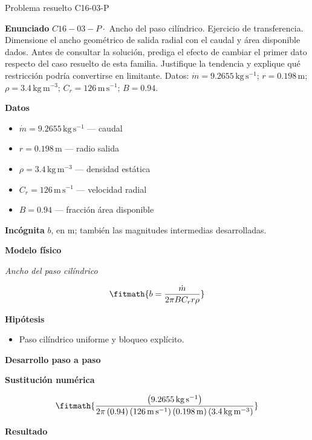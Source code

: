 \documentclass[10pt,openany]{book}
\begin{document}
\begin{studiumworked}{Problema resuelto C16-03-P}


\noindent\textbf{Enunciado}
\(C16-03-P \cdot\) Ancho del paso cilíndrico. Ejercicio de transferencia. Dimensione el ancho geométrico de salida radial con el caudal y área disponible dados. Antes de consultar la solución, prediga el efecto de cambiar el primer dato respecto del caso resuelto de esta familia. Justifique la tendencia y explique qué restricción podría convertirse en limitante. Datos: \(\dot m=9.2655\, \mathrm{kg}\,\mathrm{s}^{-1}\); \(r=0.198\, \mathrm{m}\); \(\rho=3.4\, \mathrm{kg}\,\mathrm{m}^{-3}\); \(C_r=126\, \mathrm{m}\,\mathrm{s}^{-1}\); \(B=0.94\).

\noindent\textbf{Datos}
\begin{itemize}
\item $\dot m = 9.2655\,\mathrm{kg}\,\mathrm{s}^{-1}$ — caudal
\item $r = 0.198\,\mathrm{m}$ — radio salida
\item $\rho = 3.4\,\mathrm{kg}\,\mathrm{m}^{-3}$ — densidad estática
\item $C_r = 126\,\mathrm{m}\,\mathrm{s}^{-1}$ — velocidad radial
\item $B = 0.94$ — fracción área disponible
\end{itemize}

\noindent\textbf{Incógnita}
$b$, en $\mathrm{m}$; también las magnitudes intermedias desarrolladas.

\noindent\textbf{Modelo físico}

\noindent\textit{Ancho del paso cilíndrico}

\[
\fitmath{b=\frac{\dot m}{2 \pi B C_r r \rho}}
\]

\noindent\textbf{Hipótesis}
\begin{itemize}
\item Paso cilíndrico uniforme y bloqueo explícito.
\end{itemize}

\noindent\textbf{Desarrollo paso a paso}



\noindent\textbf{Sustitución numérica}

\[
\fitmath{\frac{\left(9.2655\,\mathrm{kg}\,\mathrm{s}^{-1}\right)}{2 \pi \left(0.94\right) \left(126\,\mathrm{m}\,\mathrm{s}^{-1}\right) \left(0.198\,\mathrm{m}\right) \left(3.4\,\mathrm{kg}\,\mathrm{m}^{-3}\right)}}
\]

\noindent\textbf{Resultado}


\end{studiumworked}
\end{document}
